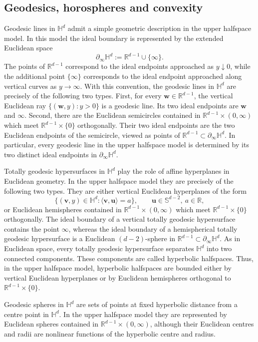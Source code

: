 \documentclass[11pt,a4paper]{article}
\theoremstyle{plain}
\theoremstyle{definition}
\theoremstyle{remark}
\newcommand{\bu}{\boldsymbol{u}}
\newcommand{\bv}{\boldsymbol{v}}
\newcommand{\bw}{\boldsymbol{w}}
\def\HH{\mathbb{H}}
\def\RR{\mathbb{R}}
\def\SS{\mathbb{S}}
\begin{document}
\subsection{Geodesics, horospheres and convexity}

Geodesic lines in $\HH^d$ admit a simple geometric description in the upper halfspace model. In this model the ideal boundary is represented by
the extended Euclidean space
\[
	\partial_\infty \HH^d
	:=
	\RR^{d-1}\cup\{\infty\}.
\]
The points of $\RR^{d-1}$ correspond to the ideal endpoints approached as
$y\downarrow0$, while the additional point $\{\infty\}$ corresponds to the
ideal endpoint approached along vertical curves as $y\to\infty$. With this convention, the geodesic lines in $\HH^d$ are precisely
of the following two types. First, for every $\bw\in\RR^{d-1}$, the vertical
Euclidean ray $\{(\bw,y):y>0\}$
is a geodesic line. Its two ideal endpoints are $\bw$ and $\infty$. Second,
there are the Euclidean semicircles contained in
$\RR^{d-1}\times(0,\infty)$ which meet $\RR^{d-1}\times\{0\}$ orthogonally. Their two ideal endpoints are the two Euclidean endpoints of
the semicircle, viewed as points of
$\RR^{d-1}\subset\partial_\infty\HH^d$. In particular, every geodesic line in the upper halfspace model is determined by its two distinct ideal endpoints in $\partial_\infty\HH^d$.


Totally geodesic hypersurfaces in $\HH^d$ play the role of affine
hyperplanes in Euclidean geometry. In the upper halfspace model they are
precisely of the following two types. They are either vertical Euclidean
hyperplanes of the form
\[
	\{(\bv,y)\in\HH^d:\langle \bv,\bu\rangle=a\},
	\qquad \bu\in\SS^{d-2},\ a\in\RR,
\]
or Euclidean hemispheres contained in $\RR^{d-1}\times(0,\infty)$ which
meet $\RR^{d-1}\times\{0\}$
orthogonally. The ideal boundary of a vertical totally geodesic hypersurface
contains the point $\infty$, whereas the ideal boundary of a hemispherical
totally geodesic hypersurface is a Euclidean $(d-2)$-sphere in
$\RR^{d-1}\subset\partial_\infty\HH^d$. As in Euclidean space, every totally geodesic hypersurface separates
$\HH^d$ into two connected components. These components are called
hyperbolic halfspaces. Thus, in the upper halfspace model, hyperbolic
halfspaces are bounded either by vertical Euclidean hyperplanes or by
Euclidean hemispheres orthogonal to $\RR^{d-1}\times\{0\}$.

Geodesic spheres in $\HH^d$ are sets of points at fixed hyperbolic distance
from a centre point in $\HH^d$. In the upper halfspace model they are represented by Euclidean spheres contained in $\RR^{d-1}\times(0,\infty)$, although their Euclidean centres and radii are nonlinear functions of the hyperbolic centre and radius.
\end{document}
